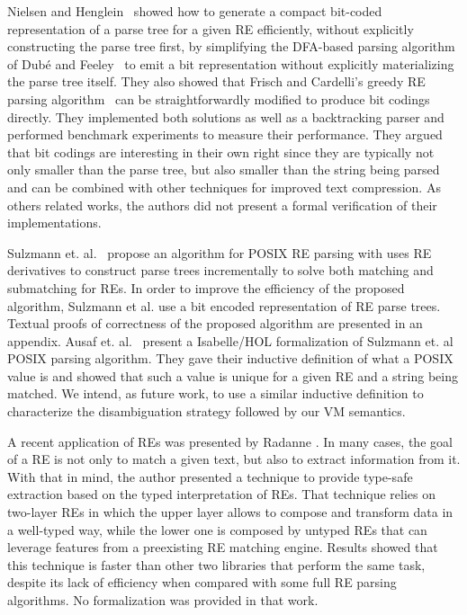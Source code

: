 \documentclass[review]{elsarticle}
\theoremstyle{definition}
\begin{document}
Nielsen and Henglein~\cite{Lasse2011} showed how to generate a compact bit-coded representation of a parse tree for a
given RE efficiently, without explicitly constructing the parse tree first, by simplifying the DFA-based parsing algorithm of
Dubé and Feeley~\cite{Dube2000} to emit a bit representation without explicitly materializing the parse tree itself.
They also showed that Frisch and Cardelli’s greedy RE parsing algorithm~\cite{Frisch2004} can be straightforwardly modified to
produce bit codings directly. They implemented both solutions as well as a backtracking parser and performed benchmark experiments
to measure their performance. They argued that bit codings are interesting in their own right since they are typically not
only smaller than the parse tree, but also smaller than the string being parsed and can be combined with other techniques for
improved text compression. As others related works, the authors did not present a formal verification of their implementations.

Sulzmann et. al.~\cite{Sulzmann14} propose an algorithm for POSIX RE parsing
with uses RE derivatives to construct parse trees incrementally to solve both 
matching and submatching for REs. In order to improve the
efficiency of the proposed algorithm, Sulzmann et al. use a bit encoded representation of RE parse trees. Textual proofs of
correctness of the proposed algorithm are presented in an appendix.
Ausaf et. al.~\cite{Ausaf16} present a Isabelle/HOL formalization of Sulzmann et. al POSIX
parsing algorithm. They gave their inductive definition of what a
POSIX value is and showed that such a value is unique for a given RE and a
string being matched. We intend, as future work, to use a similar inductive
definition to characterize the disambiguation strategy followed by our VM semantics.

A recent application of REs was presented by Radanne \cite{Radanne2019}. In many
cases, the goal of a RE is not only to match a given text, but also to extract 
information from it. With that in mind, the author presented a technique to 
provide type-safe extraction based on the typed interpretation of REs. That 
technique relies on two-layer REs in which the upper layer allows to compose and 
transform data in a well-typed way, while the lower one is composed by untyped
REs that can leverage features from a preexisting RE matching engine. Results 
showed that this technique is faster than other two libraries that perform the 
same task, despite its lack of efficiency when compared with some full RE 
parsing algorithms. No formalization was provided in that work.
\end{document}

